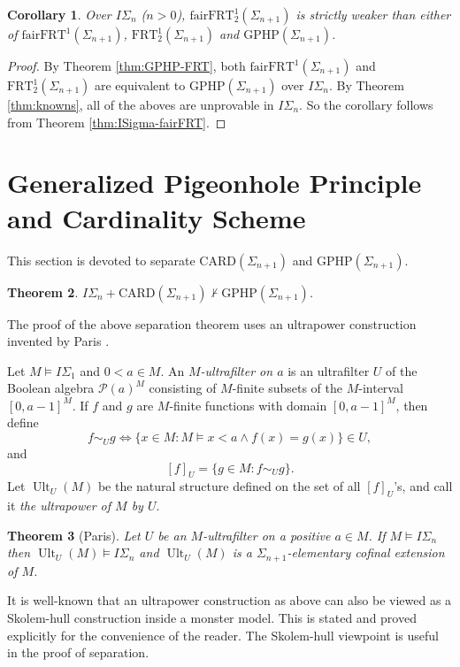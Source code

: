 \documentclass[twoside,a4paper]{amsart}
\newtheorem{theorem}{Theorem}[section]
\newtheorem{corollary}[theorem]{Corollary}
\theoremstyle{definition}
\theoremstyle{theorem}
\numberwithin{equation}{section}
\newcommand{\<}{\langle}
\renewcommand{\>}{\rangle}
\newcommand{\Ult}{\operatorname{Ult}}
\newcommand{\CARD}{\mathrm{CARD}}
\newcommand{\GPHP}{\mathrm{GPHP}}
\newcommand{\FRT}{\mathrm{FRT}}
\newcommand{\fairFRT}{\mathrm{fairFRT}}
\begin{document}
\begin{corollary}
Over $I\Sigma_n$ ($n > 0$), $\fairFRT^1_2(\Sigma_{n+1})$ is strictly weaker than either of $\fairFRT^1(\Sigma_{n+1})$, $\FRT^1_2(\Sigma_{n+1})$ and $\GPHP(\Sigma_{n+1})$.
\end{corollary}

\begin{proof}
By Theorem \ref{thm:GPHP-FRT}, both $\fairFRT^1(\Sigma_{n+1})$ and $\FRT^1_2(\Sigma_{n+1})$ are equivalent to $\GPHP(\Sigma_{n+1})$ over $I\Sigma_n$.
By Theorem \ref{thm:knowns}, all of the aboves are unprovable in $I\Sigma_n$.
So the corollary follows from Theorem \ref{thm:ISigma-fairFRT}.
\end{proof}

\section{Generalized Pigeonhole Principle and Cardinality Scheme}

This section is devoted to separate $\CARD(\Sigma_{n+1})$ and $\GPHP(\Sigma_{n+1})$.

\begin{theorem}\label{thm:CSigma-GPHP}
$I\Sigma_n + \CARD(\Sigma_{n+1}) \not\vdash \GPHP(\Sigma_{n+1})$.
\end{theorem}

The proof of the above separation theorem uses an ultrapower construction invented by Paris \cite{Paris:1981}.

Let $M \models I\Sigma_1$ and $0 < a \in M$.
An \emph{$M$-ultrafilter on $a$} is an ultrafilter $U$ of the Boolean algebra $\mathcal{P}(a)^M$ consisting of $M$-finite subsets of the $M$-interval $[0,a-1]^M$.
If $f$ and $g$ are $M$-finite functions with domain $[0,a-1]^M$, then define
\[
  f \sim_U g \Leftrightarrow \{x \in M: M \models x < a \wedge f(x) = g(x)\} \in U,
\]
and
\[
  [f]_{U} = \{g \in M: f \sim_U g\}.
\]
Let $\Ult_U(M)$ be the natural structure defined on the set of all $[f]_U$'s,
and call it \emph{the ultrapower of $M$ by $U$}.

\begin{theorem}[Paris]\label{thm:Paris-Ult}
Let $U$ be an $M$-ultrafilter on a positive $a \in M$.
If $M \models I\Sigma_n$ 
then $\Ult_U(M) \models I\Sigma_n$ and $\Ult_U(M)$ is a $\Sigma_{n+1}$-elementary cofinal extension of $M$.
\end{theorem}

It is well-known that an ultrapower construction as above can also be viewed as a Skolem-hull construction inside a monster model.
This is stated and proved explicitly for the convenience of the reader.
The Skolem-hull viewpoint is useful in the proof of separation.
\end{document}
